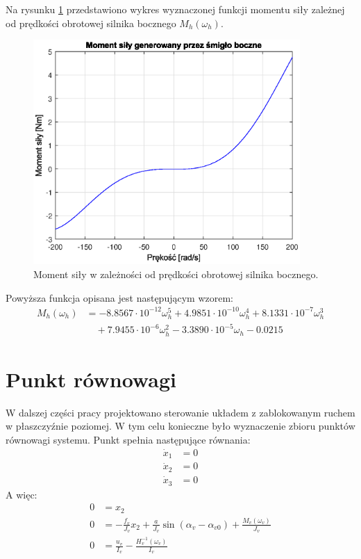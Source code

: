 \documentclass[11pt,a4paper]{article}
\begin{document}
Na rysunku \ref{fig:ident_M_h} przedstawiono wykres wyznaczonej funkcji momentu siły zależnej od prędkości obrotowej silnika bocznego \(M_h(\omega_h)\).

\begin{figure}[H]
	\centering
	\includegraphics[width=4in]{Figures/ident_M_h.eps}
	\caption{Moment siły w zależności od prędkości obrotowej silnika bocznego.}
	\label{fig:ident_M_h}
\end{figure}

Powyższa funkcja opisana jest następującym wzorem:
\begin{equation}
\begin{aligned}
M_h(\omega_h) &= -8.8567\cdot 10^{-12}\omega_h^5+4.9851\cdot 10^{-10}\omega_h^4+8.1331\cdot 10^{-7}\omega_h^3\\ & \quad +7.9455\cdot 10^{-6}\omega_h^2-3.3890\cdot 10^{-5}\omega_h-0.0215
\end{aligned}
\end{equation}

\section{Punkt równowagi}
\label{sec:punktrownowagi}
W dalszej części pracy projektowano sterowanie układem z zablokowanym ruchem w płaszczyźnie poziomej. W tym celu konieczne było wyznaczenie zbioru punktów równowagi systemu. Punkt spełnia następujące równania:
\begin{equation}
\begin{aligned}
\dot x_1 &= 0\\
\dot x_2 &= 0\\
\dot x_3 &= 0
\end{aligned}
\end{equation}
A więc:
\begin{equation}
\begin{aligned}
0 &= x_2\\
0 &= -\frac{f_v}{J_v}x_2+\frac{a}{J_v}\sin (\alpha_v-\alpha_{v0})+\frac{M_v(\omega_v)}{J_v}\\
0 &= \frac{u_v}{I_v}-\frac{H_v^{-1}(\omega_v)}{I_v}
\end{aligned}
\label{punkt_rownowagi}
\end{equation}
\end{document}
